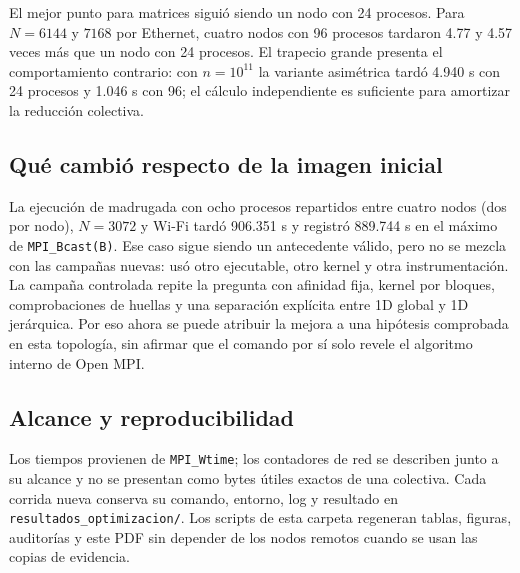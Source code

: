 El mejor punto para matrices siguió siendo un nodo con 24 procesos. Para $N=6144$ y $7168$ por Ethernet, cuatro nodos con 96 procesos tardaron 4.77 y 4.57 veces más que un nodo con 24 procesos. El trapecio grande presenta el comportamiento contrario: con $n=10^{11}$ la variante asimétrica tardó 4.940 s con 24 procesos y 1.046 s con 96; el cálculo independiente es suficiente para amortizar la reducción colectiva.

\subsection{Qué cambió respecto de la imagen inicial}

La ejecución de madrugada con ocho procesos repartidos entre cuatro nodos (dos por nodo), $N=3072$ y Wi-Fi tardó 906.351 s y registró 889.744 s en el máximo de \texttt{MPI\_Bcast(B)}. Ese caso sigue siendo un antecedente válido, pero no se mezcla con las campañas nuevas: usó otro ejecutable, otro kernel y otra instrumentación. La campaña controlada repite la pregunta con afinidad fija, kernel por bloques, comprobaciones de huellas y una separación explícita entre 1D global y 1D jerárquica. Por eso ahora se puede atribuir la mejora a una hipótesis comprobada en esta topología, sin afirmar que el comando por sí solo revele el algoritmo interno de Open MPI.

\subsection{Alcance y reproducibilidad}

Los tiempos provienen de \texttt{MPI\_Wtime}; los contadores de red se describen junto a su alcance y no se presentan como bytes útiles exactos de una colectiva. Cada corrida nueva conserva su comando, entorno, log y resultado en \texttt{resultados\_optimizacion/}. Los scripts de esta carpeta regeneran tablas, figuras, auditorías y este PDF sin depender de los nodos remotos cuando se usan las copias de evidencia.
